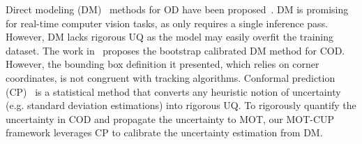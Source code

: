 

Direct modeling (DM)~\cite{feng2021review} methods for OD have been proposed~\cite{Su2022uncertainty, meyer2020learning}. DM is promising for real-time computer vision tasks, as only requires a single inference pass. However, DM lacks rigorous UQ as the model may easily overfit the training dataset. The work in~\cite{Su2022uncertainty} proposes the bootstrap calibrated DM method for COD. However, the bounding box definition it presented, which relies on corner coordinates, is not congruent with tracking algorithms. Conformal prediction (CP)~\cite{angelopoulos2021gentle} is a statistical method that converts any heuristic notion of uncertainty (e.g. standard deviation estimations) into rigorous UQ. To rigorously quantify the uncertainty in COD and propagate the uncertainty to MOT, our MOT-CUP framework leverages CP to calibrate the uncertainty estimation from DM.




